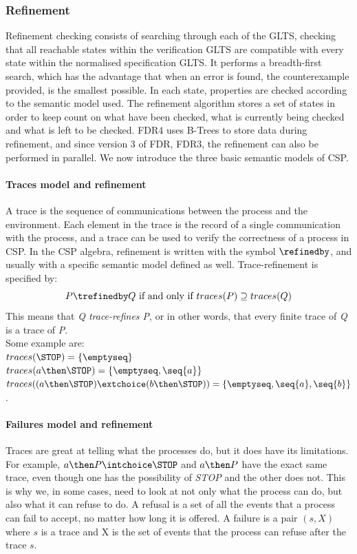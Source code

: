 \subsubsection{Refinement}
\label{sec:refinement}
Refinement checking consists of searching through each of the GLTS, checking that all reachable states within the verification GLTS are compatible with every state within the normalised specification GLTS. It performs a breadth-first search, which has the advantage that when an error is found, the counterexample provided, is the smallest possible. In each state, properties are checked according to the semantic model used. The refinement algorithm stores a set of states in order to keep count on what have been checked, what is currently being checked and what is left to be checked. FDR4 uses B-Trees to store data during refinement, and since version 3 of FDR, FDR3, the refinement can also be performed in parallel.
We now introduce the three basic semantic models of CSP.
\paragraph{Traces model and refinement}
A trace is the sequence of communications between the process and the environment. Each element in the trace is the record of a single communication with the process, and a trace can be used to verify the correctness of a process in CSP. In the CSP algebra, refinement is written with the symbol $\refinedby$, and usually with a specific semantic model defined as well. Trace-refinement is specified by: \\
$$P \trefinedby Q \text{ if and only if } traces(P) \supseteq traces(Q)$$
This means that \textit{Q trace-refines P}, or in other words, that every finite trace of \textit{Q} is a trace of \textit{P}. \\
Some example are:\\
$traces(\STOP) = \{\emptyseq\}$\\
$traces(a \then \STOP) = \{\emptyseq, \seq{a}\}$\\
$traces((a \then \STOP)\extchoice (b \then \STOP)) = \{\emptyseq, \seq{a}, \seq{b}\}$.
\paragraph{Failures model and refinement}
Traces are great at telling what the processes do, but it does have its limitations. For example, $a \then P \intchoice \STOP$ and $a \then P$ have the exact same trace, even though one has the possibility of \textit{STOP} and the other does not. This is why we, in some cases, need to look at not only what the process can do, but also what it can refuse to do. A refusal is a set of all the events that a process can fail to accept, no matter how long it is offered. A failure is a pair $(s, X)$ where $s$ is a trace and X is the set of events that the process can refuse after the trace $s$.

